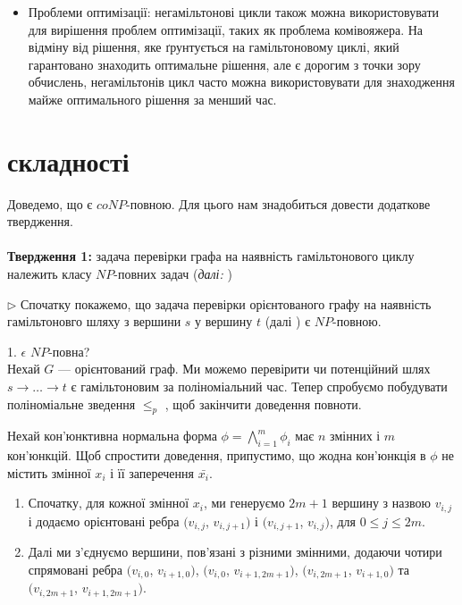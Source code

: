 \documentclass[14pt]{article}
\begin{document}
\begin{spacing}{1.175}
\begin{itemize}
\begin{itemize}
            \item Проблеми оптимізації: негамільтонові цикли також можна використовувати для вирішення проблем оптимізації, таких як проблема комівояжера. На відміну від рішення, яке ґрунтується на гамільтоновому циклі, який гарантовано знаходить оптимальне рішення, але є дорогим з точки зору обчислень, негамільтонів цикл часто можна використовувати для знаходження майже оптимального рішення за менший час.
        
        \end{itemize}
    \end{itemize}
    
    \section{ складності}

    Доведемо, що \nonhamcycle є \(coNP\)-повною. Для цього нам знадобиться довести додаткове твердження. \\\\
    \textbf{Твердження 1:} задача перевірки графа на наявність гамільтонового циклу належить класу \(NP\)-повних задач (\textit{далі:} \hamcycle)
    
    \(\triangleright\) Спочатку покажемо, що задача перевірки орієнтованого графу на наявність гамільтоновго шляху з вершини \(s\) у вершину \(t\) (далі \dhampath)  є \(NP\)-повною.

    1. \dhampath \(\epsilon\) \(NP\)-повна?\\
    Нехай \(G\) — орієнтований граф. Ми можемо перевірити чи потенційний шлях \(s \to \dots \to t\) є гамільтоновим за поліноміальний час. Тепер спробуємо побудувати поліноміальне зведення \tsat \(\le_p\) \dhampath, щоб закінчити доведення повноти.
    
    Нехай кон'юнктивна нормальна форма \(\phi = \bigwedge\limits_{i=1}^m \phi_{i}\) має \(n\) змінних і \(m\) кон'юнкцій. Щоб спростити доведення, припустимо, що жодна кон'юнкція в \(\phi\) не містить змінної \(x_i\) і її заперечення \(\bar{x_i}\).  
    
    \begin{enumerate}
        \item  Спочатку, для кожної змінної \(x_i\), ми генеруємо \(2m+1\) вершину з назвою \(v_{i,j}\) і додаємо орієнтовані ребра \((v_{i,j}\), \(v_{i,j+1})\) і \((v_{i,j+1}\), \(v_{i,j})\), для \(0 \le j \le 2m\).
        
        \item  Далі ми з’єднуємо вершини, пов’язані з різними змінними, додаючи чотири спрямовані ребра \((v_{i,0}\), \(v_{i+1,0})\), \((v_{i,0}\), \(v_{i+1,2m+1})\), \((v_{i,2m+1}\), \(v_{i+1,0})\) та \((v_{i,2m+1}\), \(v_{i+1,2m+1})\).
        

\end{enumerate}
\end{spacing}
\end{document}
